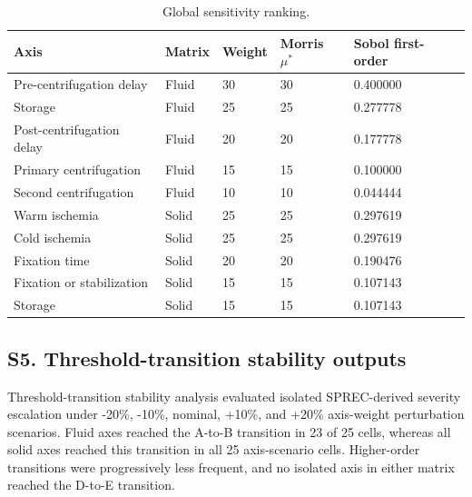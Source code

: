 \documentclass[preprint,12pt]{elsarticle}
\begin{document}
\begin{table}[!htbp]
\caption{Global sensitivity ranking.}
\label{tab:global_sensitivity_ranking}
\centering
\footnotesize
\setlength{\tabcolsep}{4pt}
\renewcommand{\arraystretch}{1.08}

\begin{tabular}{@{}L{4.0cm}C{1.7cm}C{1.8cm}C{2.3cm}C{2.6cm}@{}}
\toprule
\textbf{Axis}
& \textbf{Matrix}
& \textbf{Weight}
& \textbf{Morris \(\mu^*\)}
& \textbf{Sobol first-order} \\
\midrule

Pre-centrifugation delay
& Fluid
& 30
& 30
& 0.400000 \\

Storage
& Fluid
& 25
& 25
& 0.277778 \\

Post-centrifugation delay
& Fluid
& 20
& 20
& 0.177778 \\

Primary centrifugation
& Fluid
& 15
& 15
& 0.100000 \\

Second centrifugation
& Fluid
& 10
& 10
& 0.044444 \\

Warm ischemia
& Solid
& 25
& 25
& 0.297619 \\

Cold ischemia
& Solid
& 25
& 25
& 0.297619 \\

Fixation time
& Solid
& 20
& 20
& 0.190476 \\

Fixation or stabilization
& Solid
& 15
& 15
& 0.107143 \\

Storage
& Solid
& 15
& 15
& 0.107143 \\

\bottomrule
\end{tabular}
\end{table}

\FloatBarrier

\subsection*{S5. Threshold-transition stability outputs}

Threshold-transition stability analysis evaluated isolated SPREC-derived severity escalation under -20\%, -10\%, nominal, +10\%, and +20\% axis-weight perturbation scenarios. Fluid axes reached the A-to-B transition in 23 of 25 cells, whereas all solid axes reached this transition in all 25 axis-scenario cells. Higher-order transitions were progressively less frequent, and no isolated axis in either matrix reached the D-to-E transition.
\end{document}
